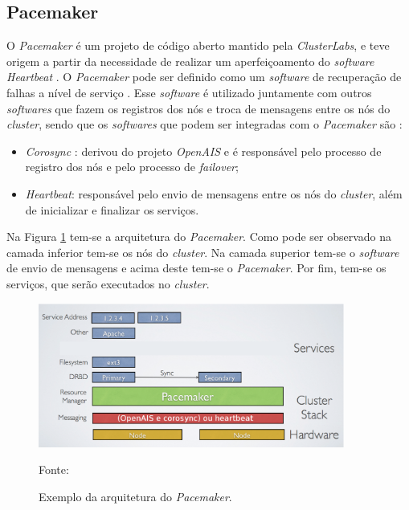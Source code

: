 
\subsection{Pacemaker}
\label{section:pacemaker}
O \textit{Pacemaker} \cite{pacemaker} é um projeto de código aberto mantido pela \textit{ClusterLabs}, e teve origem a partir da necessidade 
de realizar um aperfeiçoamento do \textit{software} \textit{Heartbeat} \cite{heartbeat}. 
O \textit{Pacemaker} pode ser definido como um \textit{software} de recuperação de falhas a nível de serviço \cite{perkov2011}. 
Esse \textit{software} é utilizado juntamente com outros \textit{softwares} que fazem os registros dos nós e troca de mensagens entre os nós do 
\textit{cluster}, sendo que os \textit{softwares} que podem ser integradas com o \textit{Pacemaker} são \cite{pacemaker}:
\begin{itemize}
 \item \textit{Corosync} \cite{corosync}: derivou do projeto \textit{OpenAIS} e é responsável pelo processo de registro dos nós e pelo processo 
 de \textit{failover};
 \item \textit{Heartbeat}: responsável pelo envio de mensagens entre os nós do \textit{cluster}, além de inicializar e finalizar os serviços.
\end{itemize}


Na Figura \ref{fig:pacemaker_tools} tem-se a arquitetura do \textit{Pacemaker}. Como pode ser observado na camada inferior tem-se os nós do 
\textit{cluster}. Na camada superior tem-se o \textit{software} de envio de mensagens e acima deste tem-se o \textit{Pacemaker}. 
Por fim, tem-se os serviços, que serão executados no \textit{cluster}.

\begin{figure}[h!]
 \centering
 \includegraphics[width=380px]{img/pacemaker_tools.eps}
 \caption{Exemplo da arquitetura do \textit{Pacemaker}.}
 Fonte: \citet{pacemaker}
 \label{fig:pacemaker_tools}
\end{figure}

